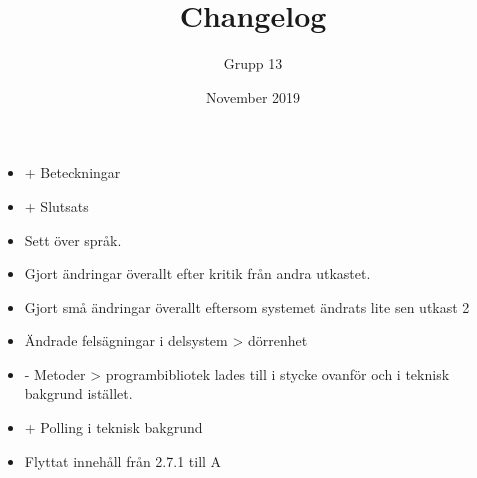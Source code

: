 \documentclass{article}
\title{Changelog}
\author{Grupp 13}
\date{November 2019}
\begin{document}
\maketitle
\begin{itemize}
    \item + Beteckningar
    \item + Slutsats
    \item Sett över språk.
    \item Gjort ändringar överallt efter kritik från andra utkastet. 
    \item Gjort små ändringar överallt eftersom systemet ändrats lite sen utkast 2
    \item Ändrade felsägningar i delsystem > dörrenhet
    \item - Metoder > programbibliotek lades till i stycke ovanför och i teknisk bakgrund istället.
    \item + Polling i teknisk bakgrund
    \item Flyttat innehåll från 2.7.1 till A
\end{itemize}
\end{document}
